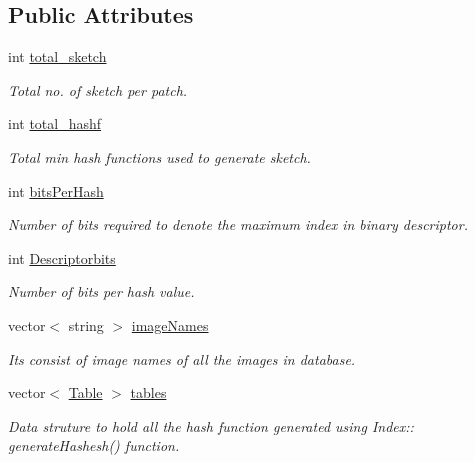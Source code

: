 \subsection*{\-Public \-Attributes}
\begin{DoxyCompactItemize}
\item 
\hypertarget{classIndex_af70cace4ee2df00ea9f3abbdd4a03e31}{int \hyperlink{classIndex_af70cace4ee2df00ea9f3abbdd4a03e31}{total\-\_\-sketch}}\label{classIndex_af70cace4ee2df00ea9f3abbdd4a03e31}

\begin{DoxyCompactList}\small\item\em \-Total no. of sketch per patch. \end{DoxyCompactList}\item 
\hypertarget{classIndex_a7e25594ed3a2d5af48a3370c36ac6481}{int \hyperlink{classIndex_a7e25594ed3a2d5af48a3370c36ac6481}{total\-\_\-hashf}}\label{classIndex_a7e25594ed3a2d5af48a3370c36ac6481}

\begin{DoxyCompactList}\small\item\em \-Total min hash functions used to generate sketch. \end{DoxyCompactList}\item 
int \hyperlink{classIndex_a32015f3d373d5ad89ec2422e6d170f26}{bits\-Per\-Hash}
\begin{DoxyCompactList}\small\item\em \-Number of bits required to denote the maximum index in binary descriptor. \end{DoxyCompactList}\item 
int \hyperlink{classIndex_ac11c8f73f786ae87d455b214d6978fd1}{\-Descriptorbits}
\begin{DoxyCompactList}\small\item\em \-Number of bits per hash value. \end{DoxyCompactList}\item 
vector$<$ string $>$ \hyperlink{classIndex_a10d91af933c37e605b1d9bd1a3995f8c}{image\-Names}
\begin{DoxyCompactList}\small\item\em \-Its consist of image names of all the images in database. \end{DoxyCompactList}\item 
\hypertarget{classIndex_a3ad2c35848d27fa5a49b78bece15902f}{vector$<$ \hyperlink{classTable}{\-Table} $>$ \hyperlink{classIndex_a3ad2c35848d27fa5a49b78bece15902f}{tables}}\label{classIndex_a3ad2c35848d27fa5a49b78bece15902f}

\begin{DoxyCompactList}\small\item\em \-Data struture to hold all the hash function generated using \-Index\-:\-: generate\-Hashesh() function. \end{DoxyCompactList}\end{DoxyCompactItemize}


